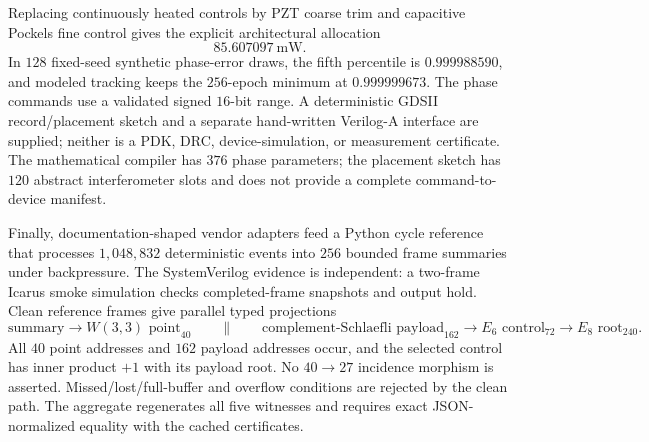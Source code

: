 Replacing continuously heated controls by PZT coarse trim and capacitive
Pockels fine control gives the explicit architectural allocation
\[
 \boxed{85.607097\ \mathrm{mW}}.
\]
In $128$ fixed-seed synthetic phase-error draws, the fifth percentile is
$0.999988590$, and modeled tracking keeps the $256$-epoch minimum at
$0.999999673$.  The phase commands use a validated signed $16$-bit range.
A deterministic GDSII record/placement sketch and a separate hand-written
Verilog-A interface are supplied; neither is a PDK, DRC, device-simulation,
or measurement certificate.  The mathematical compiler has $376$ phase
parameters; the placement sketch has $120$ abstract interferometer slots and
does not provide a complete command-to-device manifest.

Finally, documentation-shaped vendor adapters feed a Python cycle reference
that processes $1{,}048{,}832$ deterministic events into $256$ bounded frame
summaries under backpressure.  The SystemVerilog evidence is independent: a
two-frame Icarus smoke simulation checks completed-frame snapshots and output
hold.  Clean reference frames give parallel typed projections
\[
 \text{summary}\longrightarrow W(3,3)\text{ point}_{40}
 \qquad\parallel\qquad
 \text{complement-Schlaefli payload}_{162}\longrightarrow E_6\text{ control}_{72}
 \longrightarrow E_8\text{ root}_{240}.
\]
All $40$ point addresses and $162$ payload addresses occur, and the selected
control has inner product $+1$ with its payload root.  No $40\to27$ incidence
morphism is asserted.  Missed/lost/full-buffer and overflow conditions are
rejected by the clean path.  The aggregate regenerates all five witnesses and
requires exact JSON-normalized equality with the cached certificates.
